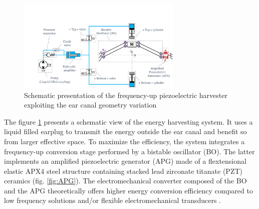 \documentclass[3p,twocolumn,preprint]{elsarticle}
\begin{document}
\begin{figure}[!htbp]
	\centering
	\captionsetup{justification=centering}
	\includegraphics[trim={3.2cm 0cm 0cm 4.3cm},clip, width=0.7\textwidth]{figures/system_presentation.pdf}
	\caption{Schematic presentation of the frequency-up piezoelectric harvester exploiting the ear canal geometry variation} 
	\label{fig:system_presentation}
\end{figure}
The figure \ref{fig:system_presentation} presents a schematic view of the energy harvesting system. It uses a liquid filled earplug to transmit the energy outside the ear canal and benefit so from larger effective space. To maximize the efficiency, the system integrates a frequency-up conversion stage performed by a bistable oscillator (BO). The latter implements an amplified piezoelectric generator (APG) made of a flextensional elastic APX4 steel structure containing stacked lead zirconate titanate (PZT) ceramics (fig. \ref{fig:APG}). The electromechanical converter composed of the BO and the APG theoretically offers higher energy conversion efficiency compared to low frequency solutions and/or flexible electromechanical transducers \cite{Guo2019}.
\end{document}
